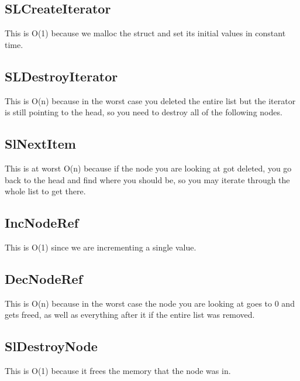 \documentclass[letterpaper,12pt]{article}
\begin{document}
\subsection*{SLCreateIterator}
This is O(1) because we malloc the struct and set its initial values in constant
time.

\subsection*{SLDestroyIterator}
This is O(n) because in the worst case you deleted the entire list but the
iterator is still pointing to the head, so you need to destroy all of the
following nodes.

\subsection*{SlNextItem}
This is at worst O(n) because if the node you are looking at got deleted, you go
back to the head and find where you should be, so you may iterate through the
whole list to get there.

\subsection*{IncNodeRef}
This is O(1) since we are incrementing a single value.

\subsection*{DecNodeRef}
This is O(n) because in the worst case the node you are looking at goes to 0 and
gets freed, as well as everything after it if the entire list was removed.

\subsection*{SlDestroyNode}
This is O(1) because it frees the memory that the node was in.
\end{document}
